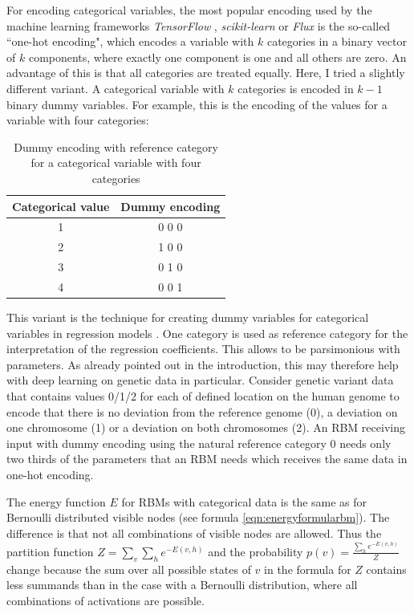 \documentclass[12pt]{article}
\newcommand{\apkg}[1]{\emph{#1}}
\begin{document}
For encoding categorical variables, the most popular encoding used by the machine learning frameworks \apkg{TensorFlow} \citep{tensorflow}, \apkg{scikit-learn} \citep{scikit-learn} or \apkg{Flux} \citep{flux} is the so-called ``one-hot encoding", which encodes a variable with $k$ categories in a binary vector of $k$ components, where exactly one component is one and all others are zero.
An advantage of this is that all categories are treated equally.
Here, I tried a slightly different variant.
A categorical variable with $k$ categories is encoded in $k-1$ binary dummy variables.
For example, this is the encoding of the values for a variable with four categories:

\begin{table}[h!]
\centering
\begin{tabular}{cc}
Categorical value & Dummy encoding \\
\hline
1 & 0 0 0 \\
2 & 1 0 0 \\
3 & 0 1 0 \\
4 & 0 0 1 \\
\end{tabular}
\caption{Dummy encoding with reference category for a categorical variable with four categories}\label{dummenc}
\end{table}

This variant is the technique for creating dummy variables for categorical variables in regression models \citep{faraway_regression}.
One category is used as reference category for the interpretation of the regression coefficients.
This allows to be parsimonious with parameters.
As already pointed out in the introduction, this may therefore help with deep learning on genetic data in particular.
Consider genetic variant data that contains values 0/1/2 for each of defined location on the human genome to encode that there is no deviation from the reference genome (0), a deviation on one chromosome (1) or a deviation on both chromosomes (2).
An RBM receiving input with dummy encoding using the natural reference category 0 needs only two thirds of the parameters that an RBM needs which receives the same data in one-hot encoding.

The energy function $E$ for RBMs with categorical data is the same as for Bernoulli distributed visible nodes (see formula \ref{eqn:energyformularbm}).
The difference is that not all combinations of visible nodes are allowed. Thus the partition function $Z = \sum_{v} \sum_{h} e^{-E(v,h)}$ and the probability
$p(v) = \frac{\sum_h e^{-E(v,h)}}{Z}$ change because the sum over all possible states of $v$ in the formula for $Z$ contains less summands than in the case with a Bernoulli distribution, where all combinations of activations are possible.
\end{document}

